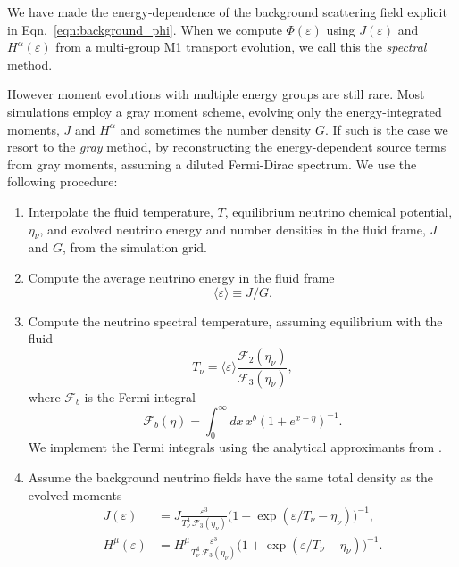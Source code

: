 \documentclass[aps,floatfix,prd,superscriptaddress,twocolumn]{revtex4-1}
\begin{document}
We have made the energy-dependence of the background scattering field
explicit in Eqn.~\ref{eqn:background_phi}.
When we compute $\Phi(\varepsilon)$ using $J(\varepsilon)$ and
$H^\alpha(\varepsilon)$ from a multi-group
M1 transport evolution, we call this the \emph{spectral} method.

However moment evolutions with multiple energy groups are still rare.
Most simulations employ a gray moment scheme,
evolving only the energy-integrated moments, $J$ and $H^\alpha$
and sometimes the number density $G$.
If such is the case we resort to the \emph{gray} method,
by reconstructing the energy-dependent source terms
from gray moments, assuming a diluted Fermi-Dirac spectrum.
We use the following procedure:
\begin{enumerate}
\item
  Interpolate the fluid temperature, $T$,
  equilibrium neutrino chemical potential, $\eta_\nu$,
  and evolved neutrino energy and number densities in the fluid frame,
  $J$ and $G$, from the simulation grid.
\item
  Compute the average neutrino energy in the fluid frame
  \begin{equation}
    \langle \varepsilon \rangle \equiv J/G.
  \end{equation}
\item
  Compute the neutrino spectral temperature, assuming equilibrium with the
  fluid
  \begin{equation}
    \label{eqn:spectral_temp}
    T_\nu = \langle \varepsilon \rangle
    \frac{\mathscr{F}_2(\eta_\nu)}{\mathscr{F}_3(\eta_\nu)},
  \end{equation}
  where $\mathscr{F}_b$ is the Fermi integral
  \begin{equation}
    \label{eqn:fermi_integral}
    \mathscr{F}_b(\eta) = \int_0^\infty dx \, x^b (1+e^{x-\eta})^{-1}.
  \end{equation}
  We implement the Fermi integrals using the analytical approximants from
  \cite{taka1978-beta_rates}.
\item
  Assume the background neutrino fields have the same total density
  as the evolved moments
  \begin{align}
    \label{eqn:J_from_gray}
    J(\varepsilon) &=
    J \frac{\varepsilon^3}{T_\nu^4 \,\mathscr{F}_3(\eta_\nu)}
    \big(1+\exp(\varepsilon/T_\nu-\eta_\nu)\big)^{-1}, \\
    \label{eqn:H_from_gray}
    H^\mu(\varepsilon) &=
    H^\mu \frac{\varepsilon^3}{T_\nu^4\, \mathscr{F}_3(\eta_\nu)}
    \big(1+\exp(\varepsilon/T_\nu-\eta_\nu)\big)^{-1}.
  \end{align}
\end{enumerate}
\end{document}
